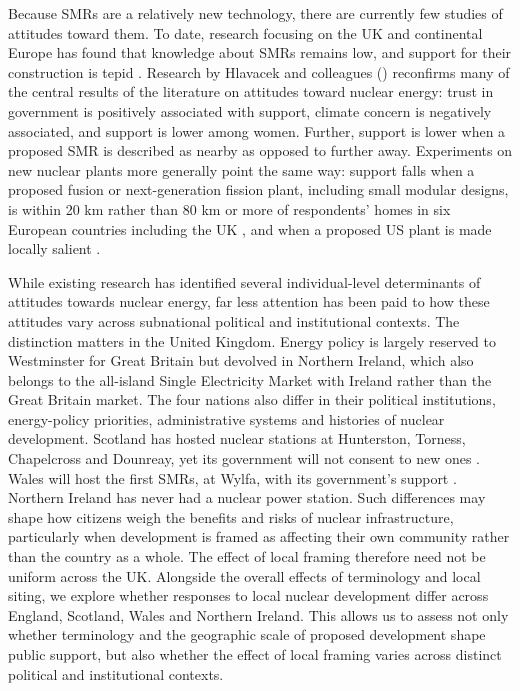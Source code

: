 \documentclass[a4paper, 11pt]{article}
\begin{document}
Because SMRs are a relatively new technology, there are currently few studies of attitudes toward them. To date, research focusing on the UK and continental Europe has found that knowledge about SMRs remains low, and support for their construction is tepid \citep{durdovic2025,jones2026,kiviluoma2025}. Research by Hlavacek and colleagues (\citeyear{hlavacek2023}) reconfirms many of the central results of the literature on attitudes toward nuclear energy: trust in government is positively associated with support, climate concern is negatively associated, and support is lower among women. Further, support is lower when a proposed SMR is described as nearby as opposed to further away. Experiments on new nuclear plants more generally point the same way: support falls when a proposed fusion or next-generation fission plant, including small modular designs, is within 20 km rather than 80 km or more of respondents' homes in six European countries including the UK \citep{biten2026}, and when a proposed US plant is made locally salient \citep{seo2026}.

While existing research has identified several individual-level determinants of attitudes towards nuclear energy, far less attention has been paid to how these attitudes vary across subnational political and institutional contexts. The distinction matters in the United Kingdom. Energy policy is largely reserved to Westminster for Great Britain but devolved in Northern Ireland, which also belongs to the all-island Single Electricity Market with Ireland rather than the Great Britain market. The four nations also differ in their political institutions, energy-policy priorities, administrative systems and histories of nuclear development. Scotland has hosted nuclear stations at Hunterston, Torness, Chapelcross and Dounreay, yet its government will not consent to new ones \citep{heffron2017, scotgov2023,desnz2026anf}. Wales will host the first SMRs, at Wylfa, with its government's support \citep{sutton2025}. Northern Ireland has never had a nuclear power station. Such differences may shape how citizens weigh the benefits and risks of nuclear infrastructure, particularly when development is framed as affecting their own community rather than the country as a whole. The effect of local framing therefore need not be uniform across the UK. Alongside the overall effects of terminology and local siting, we explore whether responses to local nuclear development differ across England, Scotland, Wales and Northern Ireland. This allows us to assess not only whether terminology and the geographic scale of proposed development shape public support, but also whether the effect of local framing varies across distinct political and institutional contexts.
\end{document}
